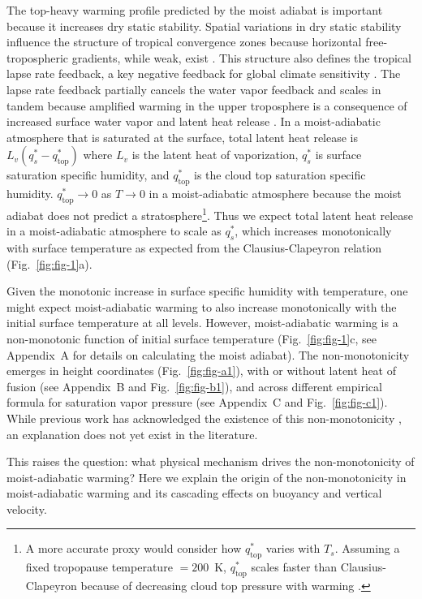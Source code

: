 \documentclass[draft]{ametsocV6.1}
\begin{document}
The top-heavy warming profile predicted by the moist adiabat is important because it increases dry static stability. Spatial variations in dry static stability influence the structure of tropical convergence zones because horizontal free-tropospheric gradients, while weak, exist \citep{neelin1987, bao2022}. This structure also defines the tropical lapse rate feedback, a key negative feedback for global climate sensitivity \citep{hansen1984}. The lapse rate feedback partially cancels the water vapor feedback and scales in tandem because amplified warming in the upper troposphere is a consequence of increased surface water vapor and latent heat release \citep{held2012}. In a moist-adiabatic atmosphere that is saturated at the surface, total latent heat release is $L_v (q_s^*-q_\mathrm{top}^*)$ where $L_v$ is the latent heat of vaporization, $q_s^*$ is surface saturation specific humidity, and $q_\mathrm{top}^*$ is the cloud top saturation specific humidity. $q_\mathrm{top}^*\to0$ as $T\to0$ in a moist-adiabatic atmosphere because the moist adiabat does not predict a stratosphere\footnote{A more accurate proxy would consider how $q_\mathrm{top}^*$ varies with $T_s$. Assuming a fixed tropopause temperature $=200$~K, $q_\mathrm{top}^*$ scales faster than Clausius-Clapeyron because of decreasing cloud top pressure with warming \citep{romps2016}.}. Thus we expect total latent heat release in a moist-adiabatic atmosphere to scale as $q_s^*$, which increases monotonically with surface temperature as expected from the Clausius-Clapeyron relation (Fig.~\ref{fig:fig-1}a).

Given the monotonic increase in surface specific humidity with temperature, one might expect moist-adiabatic warming to also increase monotonically with the initial surface temperature at all levels. However, moist-adiabatic warming is a non-monotonic function of initial surface temperature (Fig.~\ref{fig:fig-1}c, see Appendix~A for details on calculating the moist adiabat). The non-monotonicity emerges in height coordinates (Fig.~\ref{fig:fig-a1}), with or without latent heat of fusion (see Appendix~B and Fig.~\ref{fig:fig-b1}), and across different empirical formula for saturation vapor pressure (see Appendix~C and Fig.~\ref{fig:fig-c1}). While previous work has acknowledged the existence of this non-monotonicity \citep{byrne2013, levine2016}, an explanation does not yet exist in the literature.

This raises the question: what physical mechanism drives the non-monotonicity of moist-adiabatic warming? Here we explain the origin of the non-monotonicity in moist-adiabatic warming and its cascading effects on buoyancy and vertical velocity.
\end{document}
